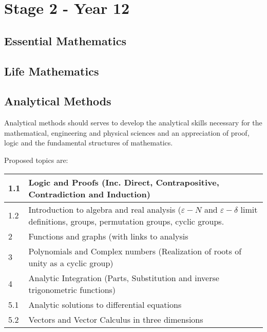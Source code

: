 \documentclass[11pt]{report}
\begin{document}
\section{Stage 2 - Year 12}

\subsection{Essential Mathematics}
\subsection{Life Mathematics}
\subsection{Analytical Methods}
    Analytical methods should serves to develop the analytical skills necessary for the mathematical, engineering and physical sciences and an appreciation of proof, logic and the fundamental structures of mathematics.

    Proposed topics are:
    \begin{table}[H]
        \centering
        \begin{tabular}{|l|l|}
        \hline
            1.1 & Logic and Proofs (Inc. Direct, Contrapositive, Contradiction and Induction) \\ \hline
            1.2 & Introduction to algebra and real analysis ($\varepsilon - N$ and $\varepsilon - \delta$ limit definitions, groups, permutation groups, cyclic groups. \\ \hline
            2 & Functions and graphs (with links to analysis \\ \hline
            3 & Polynomials and Complex numbers (Realization of roots of unity as a cyclic group)\\ \hline
            4 & Analytic Integration (Parts, Substitution and inverse trigonometric functions)\\ \hline
            5.1 & Analytic solutions to differential equations \\ \hline
            5.2 & Vectors and Vector Calculus in three dimensions\\ \hline
        \end{tabular}
    \end{table}
\end{document}
